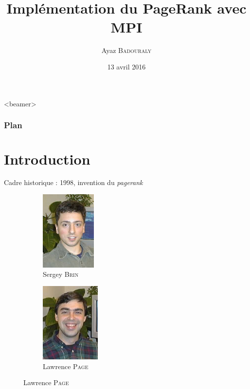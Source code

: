 \documentclass{beamer}
\title{Implémentation du PageRank avec MPI}
\author{Ayaz \textsc{Badouraly}}
\date{13 avril 2016}
\institute{École Centrale Paris}
\begin{document}
  \AtBeginSection[]
  {
    \begin{frame}<beamer>
      \frametitle{Plan}
      \tableofcontents[currentsection]%
    \end{frame}
  }


  \begin{frame}%
    \titlepage
  \end{frame}
  
  
  \begin{frame}<beamer>
    \frametitle{Plan}
    \tableofcontents%
  \end{frame}

  \section{Introduction}

    \begin{frame}
      \begin{block}{Cadre historique : 1998, invention du \textit{pagerank}}
        \bigskip
        \begin{figure}
          \begin{subfigure}{.48\textwidth}
            \centering
            \includegraphics[height=4cm]{sergey_brin.jpg}
            \caption*{Sergey \textsc{Brin}}
          \end{subfigure}
          \begin{subfigure}{.48\textwidth}
            \centering
            \includegraphics[height=4cm]{larry_page.jpg}
            \caption*{Lawrence \textsc{Page}}
          \end{subfigure}
        \end{figure}
        \medskip
      \end{block}
    \end{frame}
    
\end{document}
